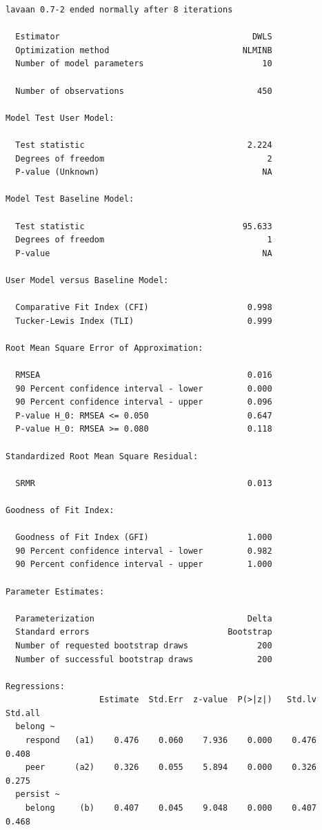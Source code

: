 \documentclass[
  letterpaper,
  DIV=11,
  numbers=noendperiod]{scrartcl}
\begin{document}
\begin{verbatim}
lavaan 0.7-2 ended normally after 8 iterations

  Estimator                                       DWLS
  Optimization method                           NLMINB
  Number of model parameters                        10

  Number of observations                           450

Model Test User Model:
                                                      
  Test statistic                                 2.224
  Degrees of freedom                                 2
  P-value (Unknown)                                 NA

Model Test Baseline Model:

  Test statistic                                95.633
  Degrees of freedom                                 1
  P-value                                           NA

User Model versus Baseline Model:

  Comparative Fit Index (CFI)                    0.998
  Tucker-Lewis Index (TLI)                       0.999

Root Mean Square Error of Approximation:

  RMSEA                                          0.016
  90 Percent confidence interval - lower         0.000
  90 Percent confidence interval - upper         0.096
  P-value H_0: RMSEA <= 0.050                    0.647
  P-value H_0: RMSEA >= 0.080                    0.118

Standardized Root Mean Square Residual:

  SRMR                                           0.013

Goodness of Fit Index:

  Goodness of Fit Index (GFI)                    1.000
  90 Percent confidence interval - lower         0.982
  90 Percent confidence interval - upper         1.000

Parameter Estimates:

  Parameterization                               Delta
  Standard errors                            Bootstrap
  Number of requested bootstrap draws              200
  Number of successful bootstrap draws             200

Regressions:
                   Estimate  Std.Err  z-value  P(>|z|)   Std.lv  Std.all
  belong ~                                                              
    respond   (a1)    0.476    0.060    7.936    0.000    0.476    0.408
    peer      (a2)    0.326    0.055    5.894    0.000    0.326    0.275
  persist ~                                                             
    belong     (b)    0.407    0.045    9.048    0.000    0.407    0.468


\end{verbatim}
\end{document}
